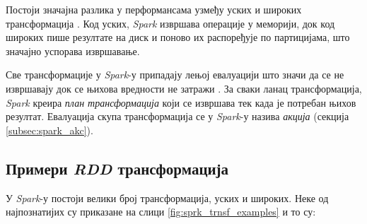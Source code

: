 \documentclass[12pt,oneside]{memoir}
\begin{document}
Постоји значајна разлика у перформансама узмеђу уских и широких трансформација \cite{spark_guide}. Код уских, \textit{Spark} извршава операције у меморији, док код широких пише резултате на диск и поново их распоређује по партицијама, што значајно успорава извршавање.

Све трансформације у \textit{Spark}-у припадају лењој евалуацији што значи да се не извршавају док се њихова вредности не затражи \cite{spark_guide}. За сваки ланац трансформација, \textit{Spark} креира \textit{план трансформација} који се извршава тек када је потребан њихов резултат. Евалуација скупа трансформација се у \textit{Spark}-у назива \textit{акција} (секција \ref{subsec:spark_akc}).




\subsection{Примери \textit{RDD} трансформација}
\label{subsec:spark_transformation_types}

У \textit{Spark}-у постоји велики број трансформација, уских и широких. Неке од најпознатијих су приказане на слици \ref{fig:sprk_trnsf_examples} и то су:
\end{document}
